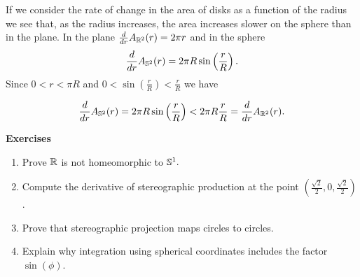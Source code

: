 If we consider the rate of change in the area of disks as a function of the radius
we see that, as the radius increases, the area increases slower on the sphere
than in the plane. 
In the plane $\frac{d}{dr}A_{\mathbb{R}^2}(r) =2\pi r$ and in the sphere
$$\frac{d}{dr}A_{\mathbb{S}^2}(r)=2\pi R\sin \left(\frac{r}{R}\right).$$
Since $0<r<\pi R$ and $0<\sin\left(\frac{r}{R}\right)< \frac{r}{R}$ we have

$$\frac{d}{dr}A_{\mathbb{S}^2}(r)=2\pi R\sin \left(\frac{r}{R}\right)<2\pi R \frac{r}{R}=\frac{d}{dr}A_{\mathbb{R}^2}(r).$$


\noindent \textbf{Exercises}


\begin{enumerate}
	\item Prove $\mathbb{R}$ is not homeomorphic to $\mathbb{S}^1.$
	
	\item Compute the derivative of stereographic production at the point $(\frac{\sqrt{2}}{2},0,\frac{\sqrt{2}}{2})$.
	
	\item Prove that stereographic projection maps circles to circles.
	
	\item Explain why integration using spherical coordinates includes the factor $\sin(\phi).$
	
\end{enumerate}

\pagebreak